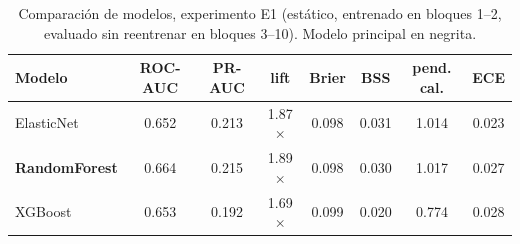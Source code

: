\begin{table}[H]
\centering\small
\begin{tabular}{lccccccc}
\toprule
Modelo & ROC-AUC & PR-AUC & lift & Brier & BSS & pend. cal. & ECE \\
\midrule
ElasticNet & 0.652 & 0.213 & 1.87$\times$ & 0.098 & 0.031 & 1.014 & 0.023 \\
\textbf{RandomForest} & 0.664 & 0.215 & 1.89$\times$ & 0.098 & 0.030 & 1.017 & 0.027 \\
XGBoost & 0.653 & 0.192 & 1.69$\times$ & 0.099 & 0.020 & 0.774 & 0.028 \\
\bottomrule
\end{tabular}
\caption{Comparación de modelos, experimento E1 (estático, entrenado en bloques 1--2, evaluado sin reentrenar en bloques 3--10). Modelo principal en negrita.}
\label{tab:modelos}
\end{table}
